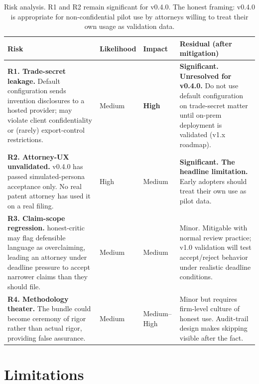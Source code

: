\documentclass[11pt,letterpaper]{article}
\begin{document}
\begin{table}[h]
\centering
\footnotesize
\begin{tabularx}{\linewidth}{@{}p{3.1cm} p{1.6cm} p{1.6cm} X@{}}
\toprule
\textbf{Risk} & \textbf{Likelihood} & \textbf{Impact} & \textbf{Residual (after mitigation)} \\
\midrule
\textbf{R1. Trade-secret leakage.} Default configuration sends invention disclosures to a hosted provider; may violate client confidentiality or (rarely) export-control restrictions.
  & Medium & \textbf{High} & \textbf{Significant. Unresolved for v0.4.0.} Do not use default configuration on trade-secret matter until on-prem deployment is validated (v1.x roadmap). \\
\midrule
\textbf{R2. Attorney-UX unvalidated.} v0.4.0 has passed simulated-persona acceptance only. No real patent attorney has used it on a real filing.
  & High & Medium & \textbf{Significant. The headline limitation.} Early adopters should treat their own use as pilot data. \\
\midrule
\textbf{R3. Claim-scope regression.} honest-critic may flag
  defensible language as overclaiming, leading an attorney under
  deadline pressure to accept narrower claims than they should file.
  & Medium & Medium & Minor. Mitigable with normal review practice; v1.0 validation will test accept/reject behavior under realistic deadline conditions. \\
\midrule
\textbf{R4. Methodology theater.} The bundle could become ceremony of rigor rather than actual rigor, providing false assurance.
  & Medium & Medium--High & Minor but requires firm-level culture of honest use. Audit-trail design makes skipping visible after the fact. \\
\bottomrule
\end{tabularx}
\caption{Risk analysis. R1 and R2 remain significant for v0.4.0. The
honest framing: v0.4.0 is appropriate for non-confidential pilot use
by attorneys willing to treat their own usage as validation data.}
\label{tab:risks}
\end{table}

\section{Limitations}
\end{document}
